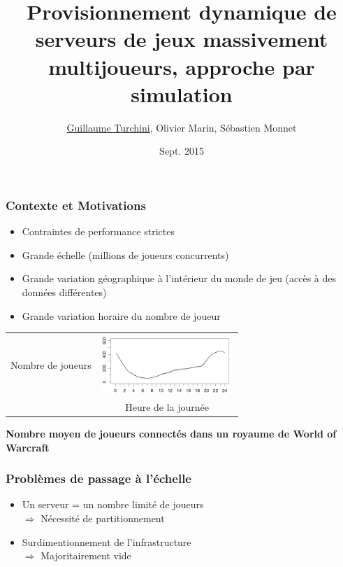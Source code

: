 \documentclass{beamer}
\title[Provisionnement dynamique de serveurs de MMOG]{Provisionnement dynamique de serveurs de jeux massivement multijoueurs, approche par simulation}
\author{\underline{Guillaume Turchini}, Olivier Marin, Sébastien Monnet}
\institute{Présentation stage}
\date{Sept. 2015}
\begin{document}
\begin{frame}
  \titlepage
\end{frame}


\begin{frame}
  \frametitle{Contexte et Motivations}
  \begin{itemize}
    \item{Contraintes de performance strictes}
    \item{Grande échelle (millions de joueurs concurrents)}
    \item{Grande variation géographique à l'intérieur du monde de jeu (accès à des données différentes)}
    \item{Grande variation horaire du nombre de joueur}
  \end{itemize}
  \vspace{0.5cm}

  \centering
  \begin{tabular}{cc}
    \begin{sideways}\scriptsize{Nombre de joueurs}\end{sideways} &
    \includegraphics[width=5cm]{player_day_evol.png}\\
    & \scriptsize{Heure de la journée}
  \end{tabular}
  
  \scriptsize\textbf{Nombre moyen de joueurs connectés dans un royaume de World of Warcraft}\\
\end{frame}

\begin{frame}
  \frametitle{Problèmes de passage à l'échelle}
  \begin{itemize}
    \item{Un serveur = un nombre limité de joueurs
      \\[1mm]\hspace{1cm}$\Rightarrow$ Nécessité de partitionnement\vspace{5mm}}
    \item{Surdimentionnement de l'infrastructure
      \\[1mm]\hspace{1cm}$\Rightarrow$ Majoritairement vide}
  \end{itemize}
\end{frame}
\end{document}
